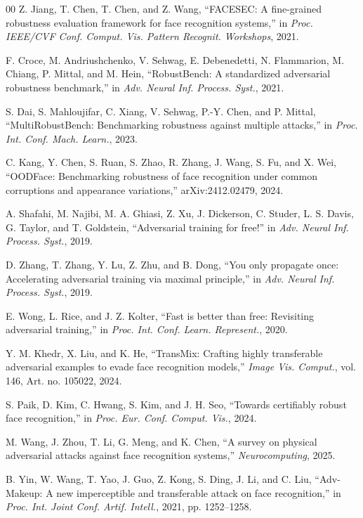 \documentclass[conference]{IEEEtran}
\begin{document}
\begin{thebibliography}{00}
 Z. Jiang, T. Chen, T. Chen, and Z. Wang, ``FACESEC: A
fine-grained robustness evaluation framework for face recognition systems,''
in \emph{Proc. IEEE/CVF Conf. Comput. Vis. Pattern Recognit. Workshops}, 2021.

 F. Croce, M. Andriushchenko, V. Sehwag, E. Debenedetti,
N. Flammarion, M. Chiang, P. Mittal, and M. Hein, ``RobustBench: A
standardized adversarial robustness benchmark,'' in \emph{Adv. Neural Inf.
Process. Syst.}, 2021.

 S. Dai, S. Mahloujifar, C. Xiang, V. Sehwag,
P.-Y. Chen, and P. Mittal, ``MultiRobustBench: Benchmarking robustness against
multiple attacks,'' in \emph{Proc. Int. Conf. Mach. Learn.}, 2023.

 C. Kang, Y. Chen, S. Ruan, S. Zhao, R. Zhang, J. Wang,
S. Fu, and X. Wei, ``OODFace: Benchmarking robustness of face recognition under
common corruptions and appearance variations,'' arXiv:2412.02479, 2024.

 A. Shafahi, M. Najibi, M. A. Ghiasi, Z. Xu, J. Dickerson,
C. Studer, L. S. Davis, G. Taylor, and T. Goldstein, ``Adversarial training
for free!'' in \emph{Adv. Neural Inf. Process. Syst.}, 2019.

 D. Zhang, T. Zhang, Y. Lu, Z. Zhu, and B. Dong, ``You only
propagate once: Accelerating adversarial training via maximal principle,'' in
\emph{Adv. Neural Inf. Process. Syst.}, 2019.

 E. Wong, L. Rice, and J. Z. Kolter, ``Fast is better than
free: Revisiting adversarial training,'' in \emph{Proc. Int. Conf. Learn.
Represent.}, 2020.

 Y. M. Khedr, X. Liu, and K. He, ``TransMix: Crafting
highly transferable adversarial examples to evade face recognition models,''
\emph{Image Vis. Comput.}, vol. 146, Art. no. 105022, 2024.

 S. Paik, D. Kim, C. Hwang, S. Kim, and J. H. Seo,
``Towards certifiably robust face recognition,'' in \emph{Proc. Eur. Conf.
Comput. Vis.}, 2024.

 M. Wang, J. Zhou, T. Li, G. Meng, and K. Chen, ``A
survey on physical adversarial attacks against face recognition systems,''
\emph{Neurocomputing}, 2025.

 B. Yin, W. Wang, T. Yao, J. Guo, Z. Kong, S. Ding,
J. Li, and C. Liu, ``Adv-Makeup: A new imperceptible and transferable attack
on face recognition,'' in \emph{Proc. Int. Joint Conf. Artif. Intell.}, 2021,
pp. 1252--1258.


\end{thebibliography}
\end{document}
